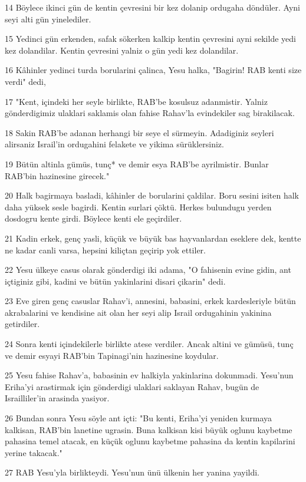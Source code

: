 \par 14 Böylece ikinci gün de kentin çevresini bir kez dolanip ordugaha döndüler. Ayni seyi alti gün yinelediler.
\par 15 Yedinci gün erkenden, safak sökerken kalkip kentin çevresini ayni sekilde yedi kez dolandilar. Kentin çevresini yalniz o gün yedi kez dolandilar.
\par 16 Kâhinler yedinci turda borularini çalinca, Yesu halka, "Bagirin! RAB kenti size verdi" dedi,
\par 17 "Kent, içindeki her seyle birlikte, RAB'be kosulsuz adanmistir. Yalniz gönderdigimiz ulaklari saklamis olan fahise Rahav'la evindekiler sag birakilacak.
\par 18 Sakin RAB'be adanan herhangi bir seye el sürmeyin. Adadiginiz seyleri alirsaniz Israil'in ordugahini felakete ve yikima sürüklersiniz.
\par 19 Bütün altinla gümüs, tunç* ve demir esya RAB'be ayrilmistir. Bunlar RAB'bin hazinesine girecek."
\par 20 Halk bagirmaya basladi, kâhinler de borularini çaldilar. Boru sesini isiten halk daha yüksek sesle bagirdi. Kentin surlari çöktü. Herkes bulundugu yerden dosdogru kente girdi. Böylece kenti ele geçirdiler.
\par 21 Kadin erkek, genç yasli, küçük ve büyük bas hayvanlardan eseklere dek, kentte ne kadar canli varsa, hepsini kiliçtan geçirip yok ettiler.
\par 22 Yesu ülkeye casus olarak gönderdigi iki adama, "O fahisenin evine gidin, ant içtiginiz gibi, kadini ve bütün yakinlarini disari çikarin" dedi.
\par 23 Eve giren genç casuslar Rahav'i, annesini, babasini, erkek kardesleriyle bütün akrabalarini ve kendisine ait olan her seyi alip Israil ordugahinin yakinina getirdiler.
\par 24 Sonra kenti içindekilerle birlikte atese verdiler. Ancak altini ve gümüsü, tunç ve demir esyayi RAB'bin Tapinagi'nin hazinesine koydular.
\par 25 Yesu fahise Rahav'a, babasinin ev halkiyla yakinlarina dokunmadi. Yesu'nun Eriha'yi arastirmak için gönderdigi ulaklari saklayan Rahav, bugün de Israilliler'in arasinda yasiyor.
\par 26 Bundan sonra Yesu söyle ant içti: "Bu kenti, Eriha'yi yeniden kurmaya kalkisan, RAB'bin lanetine ugrasin. Buna kalkisan kisi büyük oglunu kaybetme pahasina temel atacak, en küçük oglunu kaybetme pahasina da kentin kapilarini yerine takacak."
\par 27 RAB Yesu'yla birlikteydi. Yesu'nun ünü ülkenin her yanina yayildi.

